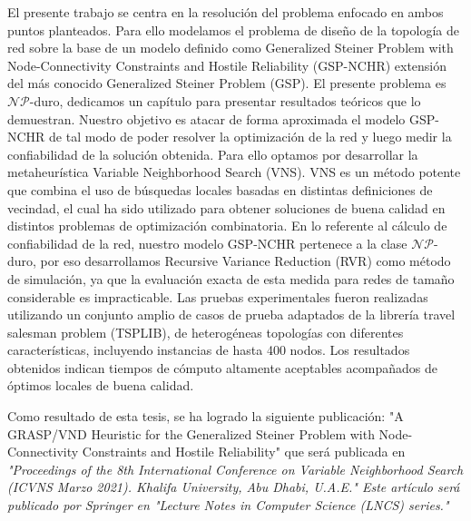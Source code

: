 \begin{foreignabstract}
El presente trabajo se centra en la resoluci\'on del problema enfocado en ambos puntos planteados. Para ello modelamos el problema de dise\~no de la topolog\'ia de red sobre la base de un modelo definido como Generalized Steiner Problem with Node-Connectivity Constraints and Hostile Reliability (GSP-NCHR) extensi\'on del m\'as conocido Generalized Steiner Problem (GSP).
El presente problema es $\mathcal{NP}$-duro, dedicamos un cap\'itulo para presentar resultados te\'oricos que lo demuestran. Nuestro objetivo es atacar de forma aproximada el modelo GSP-NCHR de tal modo de poder resolver la optimizaci\'on de la red y luego medir la confiabilidad de la soluci\'on obtenida. Para ello optamos por desarrollar la metaheur\'istica Variable Neighborhood Search (VNS). VNS es un m\'etodo potente que combina el uso de b\'usquedas locales basadas en distintas definiciones de vecindad, el cual ha sido utilizado para obtener soluciones de buena calidad en distintos problemas de optimizaci\'on combinatoria. 
En lo referente al c\'alculo de confiabilidad de la red, nuestro modelo GSP-NCHR pertenece a la clase $\mathcal{NP}$-duro, por eso desarrollamos Recursive Variance Reduction (RVR) como m\'etodo de simulaci\'on, ya que la evaluaci\'on exacta de esta medida para redes de tama\~no considerable es impracticable. 
Las pruebas experimentales fueron realizadas utilizando un conjunto amplio de casos de prueba adaptados de la librer\'ia travel salesman problem (TSPLIB), de heterog\'eneas topolog\'ias con diferentes caracter\'isticas, incluyendo instancias de hasta 400 nodos. Los resultados obtenidos indican tiempos de 
c\'omputo altamente aceptables acompa\~nados de \'optimos locales de buena calidad.

\end{foreignabstract}

Como resultado de esta tesis, se ha logrado la siguiente publicaci\'on: "A GRASP/VND Heuristic for the Generalized Steiner Problem with Node-Connectivity Constraints and Hostile Reliability" que ser\'a publicada en \textit{"Proceedings of the 8th International Conference on Variable Neighborhood Search (ICVNS Marzo 2021). Khalifa University, Abu Dhabi, U.A.E." Este art\'iculo ser\'a publicado por Springer en "Lecture Notes in Computer Science (LNCS) series."}


